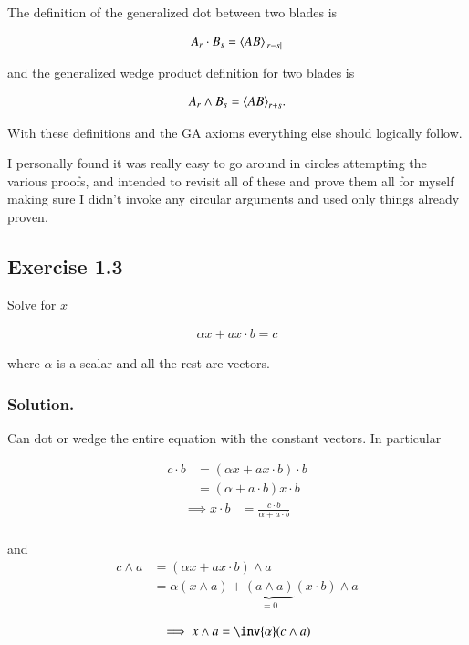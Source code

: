 The definition of the generalized dot between two blades is

\begin{align}\label{eqn:nfcm_ch2:generalDot}
A_r \cdot B_s = {\left\langle{{A B}}\right\rangle}_{{\left\lvert{r -s}\right\rvert}}
\end{align}

and the generalized wedge product definition for two blades is 

\begin{align}\label{eqn:nfcm_ch2:generalWedge}
A_r \wedge B_s = {\left\langle{{A B}}\right\rangle}_{r + s}.
\end{align}

With these definitions and the GA axioms everything else should logically follow.

I personally found it was really easy to go around in circles attempting the various proofs, and intended to revisit all of these
and prove them all for myself making sure I didn't invoke any circular arguments and used only things already proven.

\subsection{Exercise 1.3 }

Solve for $x$

\begin{align*}
\alpha x + a x \cdot b = c
\end{align*}

where $\alpha$ is a scalar and all the rest are vectors.

\subsubsection{Solution. }

Can dot or wedge the entire equation with the constant vectors.  In particular

\begin{align*}
c \cdot b &= (\alpha x + a x \cdot b) \cdot b \\ 
&= (\alpha + a \cdot b) x \cdot b 
\end{align*}
\begin{align*}
\implies
x \cdot b &= \frac{c \cdot b}{\alpha + a \cdot b} \\
\end{align*}

and
\begin{align*}
c \wedge a &= (\alpha x + a x \cdot b) \wedge a \\ 
&= \alpha (x \wedge a) + \underbrace{(a \wedge a)}_{=0} (x \cdot b) \wedge a \\
\end{align*}
\begin{align*}
\implies
x \wedge a &= \inv{\alpha} (c \wedge a) \\
\end{align*}

